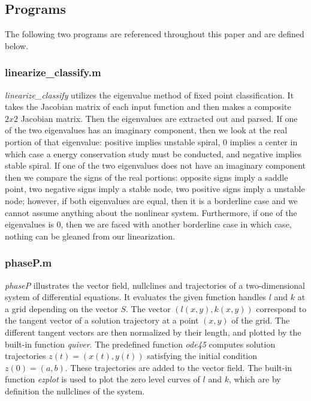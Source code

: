 \documentclass[11pt,a4paper]{scrartcl}
\theoremstyle{definition}
\begin{document}
\subsection{Programs}
The following two programs are referenced throughout this paper and are defined below.
\subsubsection{linearize\_classify.m}

\textit{linearize\_classify} utilizes the eigenvalue method of fixed point classification. It takes the Jacobian matrix of each input function and then makes a composite $2x2$ Jacobian matrix. Then the eigenvalues are extracted out and parsed. If one of the two eigenvalues has an imaginary component, then we look at the real portion of that eigenvalue: positive implies unstable spiral, $0$ implies a center in which case a energy conservation study must be conducted, and negative implies stable spiral. If one of the two eigenvalues does not have an imaginary component then we compare the signs of the real portions: opposite signs imply a saddle point, two negative signs imply a stable node, two positive signs imply a unstable node; however, if both eigenvalues are equal, then it is a borderline case and we cannot assume anything about the nonlinear system. Furthermore, if one of the eigenvalues is $0$, then we are faced with another borderline case in which case, nothing can be gleaned from our linearization.\newline
\subsubsection{phaseP.m}

\textit{phaseP} illustrates the vector field, nullclines and trajectories of a two-dimensional system of differential equations. It evaluates the given function handles $l$ and $k$ at a grid depending on the vector $S$. The vector $(l(x,y), k(x,y))$ correspond to the tangent vector of a solution trajectory at a point $(x,y)$ of the grid. The different tangent vectors are then normalized by their length, and plotted by the built-in function \textit{quiver}. The predefined function \textit{ode45} computes solution trajectories $z(t)=(x(t),y(t))$ satisfying the initial condition $z(0)=(a,b)$. These trajectories are added to the vector field. The built-in function \textit{ezplot} is used to plot the zero level curves of $l$ and $k$, which are by definition the nullclines of the system.
\vspace{1em}
\end{document}
